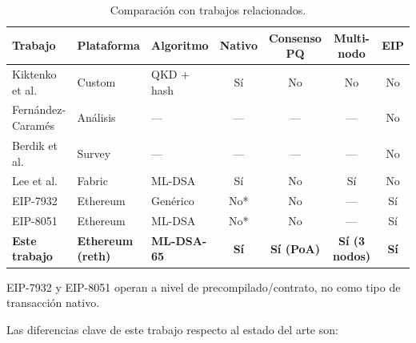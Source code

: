 \begin{table}[htbp]
\centering
\caption{Comparación con trabajos relacionados.}
\label{tab:comparison}
\begin{tabular}{@{}L{2.5cm}L{2cm}L{2cm}cccc@{}}
\toprule
\textbf{Trabajo} & \textbf{Plataforma} & \textbf{Algoritmo} & \textbf{Nativo} & \textbf{Consenso PQ} & \textbf{Multi-nodo} & \textbf{EIP} \\
\midrule
Kiktenko et al. \parencite{quantumsafeblockchain2018} & Custom & QKD + hash & Sí & No & No & No \\
Fernández-Caramés \parencite{quantumresistance2023nature} & Análisis & --- & --- & --- & --- & No \\
Berdik et al. \parencite{surveycomparison2023} & Survey & --- & --- & --- & --- & No \\
Lee et al. \parencite{quantumsafefabric2024} & Fabric & ML-DSA & Sí & No & Sí & No \\
EIP-7932 \parencite{eip7932} & Ethereum & Genérico & No* & No & --- & Sí \\
EIP-8051 \parencite{eip8051} & Ethereum & ML-DSA & No* & No & --- & Sí \\
\textbf{Este trabajo} & \textbf{Ethereum (reth)} & \textbf{ML-DSA-65} & \textbf{Sí} & \textbf{Sí (PoA)} & \textbf{Sí (3 nodos)} & \textbf{Sí} \\
\bottomrule
\end{tabular}
\end{table}

\noindent *EIP-7932 y EIP-8051 operan a nivel de precompilado/contrato, no como tipo de transacción nativo.

Las diferencias clave de este trabajo respecto al estado del arte son:

